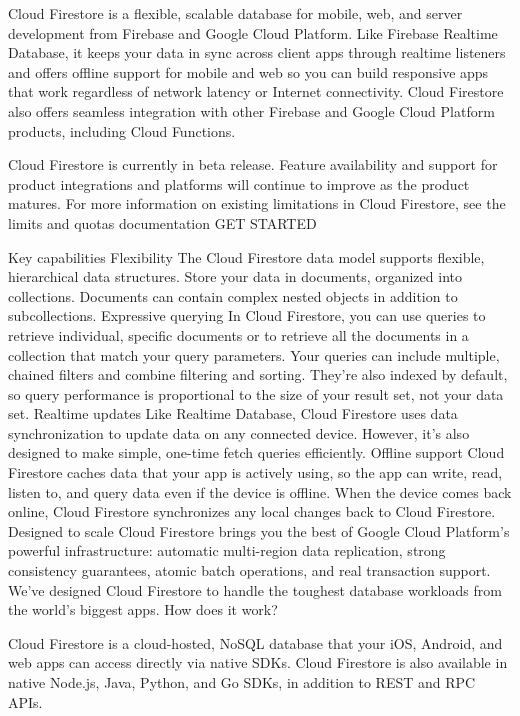 Cloud Firestore is a flexible, scalable database for mobile, web, and server development from Firebase and Google Cloud Platform. Like Firebase Realtime Database, it keeps your data in sync across client apps through realtime listeners and offers offline support for mobile and web so you can build responsive apps that work regardless of network latency or Internet connectivity. Cloud Firestore also offers seamless integration with other Firebase and Google Cloud Platform products, including Cloud Functions.

Cloud Firestore is currently in beta release. Feature availability and support for product integrations and platforms will continue to improve as the product matures. For more information on existing limitations in Cloud Firestore, see the limits and quotas documentation
GET STARTED

Key capabilities
Flexibility	The Cloud Firestore data model supports flexible, hierarchical data structures. Store your data in documents, organized into collections. Documents can contain complex nested objects in addition to subcollections.
Expressive querying	In Cloud Firestore, you can use queries to retrieve individual, specific documents or to retrieve all the documents in a collection that match your query parameters. Your queries can include multiple, chained filters and combine filtering and sorting. They're also indexed by default, so query performance is proportional to the size of your result set, not your data set.
Realtime updates	Like Realtime Database, Cloud Firestore uses data synchronization to update data on any connected device. However, it's also designed to make simple, one-time fetch queries efficiently.
Offline support	Cloud Firestore caches data that your app is actively using, so the app can write, read, listen to, and query data even if the device is offline. When the device comes back online, Cloud Firestore synchronizes any local changes back to Cloud Firestore.
Designed to scale	Cloud Firestore brings you the best of Google Cloud Platform's powerful infrastructure: automatic multi-region data replication, strong consistency guarantees, atomic batch operations, and real transaction support. We've designed Cloud Firestore to handle the toughest database workloads from the world's biggest apps.
How does it work?


Cloud Firestore is a cloud-hosted, NoSQL database that your iOS, Android, and web apps can access directly via native SDKs. Cloud Firestore is also available in native Node.js, Java, Python, and Go SDKs, in addition to REST and RPC APIs.

